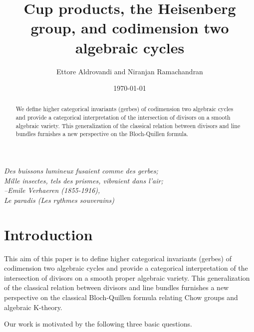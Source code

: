 \documentclass{amsart}
\title[Cup products and the Heisenberg group]{Cup products, the Heisenberg
  group, and codimension two algebraic cycles}
\author{Ettore Aldrovandi and Niranjan Ramachandran}
\date{\today}
\numberwithin{equation}{subsection}
\theoremstyle{remark}
\theoremstyle{remark}
\begin{document}
\begin{abstract}We define higher categorical invariants (gerbes) of codimension two algebraic cycles and provide a categorical interpretation of the intersection of divisors on a smooth algebraic variety. This generalization of the classical relation between divisors and line bundles furnishes a new perspective on the Bloch-Quillen formula. 
 \end{abstract}
\maketitle

\tableofcontents
\newpage

\begin{flushright}
\itshape Des buissons lumineux fusaient comme des gerbes;\\
Mille insectes, tels des prismes, vibraient dans l'air;\\
\normalfont  --Emile Verhaeren (1855-1916), \\
 \textit{Le paradis} (Les rythmes souverains)
\end{flushright}
 
\section{Introduction}

This aim of this paper is to define higher categorical invariants (gerbes) of codimension two algebraic cycles and provide a categorical interpretation of the intersection of divisors on a smooth proper algebraic variety. This generalization of the classical relation between divisors and line bundles furnishes a new perspective on the classical Bloch-Quillen formula relating Chow groups and algebraic K-theory.

Our work is motivated by the following three basic  questions. 
\end{document}
